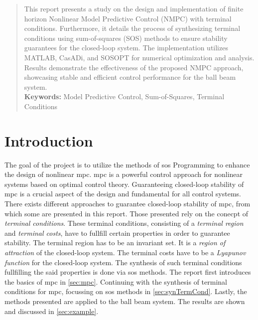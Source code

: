 \documentclass[10pt,a4paper,titlepage]{article}
\begin{document}
\vskip 0.5cm

\begin{abstract}

This report presents a study on the design and implementation of finite horizon Nonlinear Model Predictive Control (NMPC) with terminal conditions.
Furthermore, it details the process of synthesizing terminal conditions using sum-of-squares (SOS) methods to ensure stability guarantees for the closed-loop system.
The implementation utilizes MATLAB, CasADi, and SOSOPT for numerical
optimization and analysis. Results demonstrate the effectiveness of the proposed NMPC approach, showcasing stable and efficient control performance
for the ball beam system.\\

\noindent
\textbf{Keywords:} Model Predictive Control, Sum-of-Squares, Terminal Conditions

\end{abstract}

\vskip 0.5cm


\section{Introduction}
The goal of the project is to utilize the methods of \gls{sos} Programming to enhance the design of nonlinear \gls{mpc}.
\gls{mpc} is a powerful control approach for nonlinear systems based on optimal control theory.
Guaranteeing closed-loop stability of \gls{mpc} is a crucial aspect of the design and fundamental for all control systems.
There exists different approaches to guarantee closed-loop stability of \gls{mpc}, from which some are presented in this report.
Those presented rely on the conecpt of \textit{terminal conditions}. These terminal conditions, consisting of a \textit{terminal region} 
and \textit{terminal costs}, have to fullfill certain properties in order to guarantee stability. The terminal region has to be an invariant set.
It is a \textit{region of attraction} of the closed-loop system. The terminal costs have to be a \textit{Lyapunov function} for the closed-loop system.
The synthesis of such terminal conditions fullfilling the said properties is done via \gls{sos} methods. The report first introduces the basics of \gls{mpc} in \ref{sec:mpc}. Continuing with the synthesis of terminal conditions for \gls{mpc},
focussing on \gls{sos} methods in \ref{sec:synTermCond}. Lastly, the methods presented are applied to the 
ball beam system. The results are shown and discussed in \ref{sec:example}.
\end{document}
